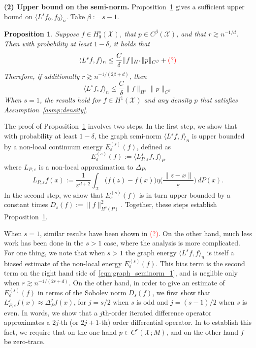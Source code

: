 \documentclass{article}
\newcommand{\1}{\mathbf{1}}
\newcommand{\mc}[1]{\mathcal{#1}}
\newcommand{\dotp}[2]{\langle #1, #2 \rangle}
\theoremstyle{alden}
\theoremstyle{aldenthm}
\newtheorem{proposition}{Proposition}
\theoremstyle{definition}
\theoremstyle{remark}
\begin{document}
\textbf{(2) Upper bound on the semi-norm. } Proposition~\ref{prop:graph_seminorm} gives a sufficient upper bound on $\dotp{L^s f_0}{f_0}_n$. Take $\beta := s - 1$. 
\begin{proposition}
	\label{prop:graph_seminorm} 
	Suppose $f \in H_0^s(\mc{X})$, that $p \in C^{\beta}(\mc{X})$, and that $r \gtrsim n^{-1/d}$. Then with probability at least $1 - \delta$, it holds that 
	\begin{equation}
	\label{eqn:graph_seminorm_1}
	\dotp{L^s f}{f}_n \leq \frac{C}{\delta} \|f\|_{H^s} \|p\|_{C^{\beta}} + \textcolor{red}{(?)}
	\end{equation}
	Therefore, if additionally $r \gtrsim n^{-1/(2\beta + d)}$, then 
	\begin{equation}
	\label{eqn:graph_seminorm_2}
	\dotp{L^s f}{f}_n \leq \frac{C}{\delta} \|f\|_{H^s} \|p\|_{C^{\beta}}
	\end{equation}
	When $s = 1$, the results hold for $f \in H^1(\mc{X})$ and any density $p$ that satisfies Assumption~\ref{asmp:density}.
\end{proposition}
The proof of Proposition~\ref{prop:graph_seminorm} involves two steps. In the first step, we show that with probability at least $1 - \delta$, the graph semi-norm $\dotp{L^s f}{f}_n$ is upper bounded by a non-local continuum energy $E_{\varepsilon}^{(s)}(f)$, defined as
\begin{equation*}
E_{\varepsilon}^{(s)}(f) := \dotp{L_{P,\varepsilon}^sf}{f}_{P}
\end{equation*}
where $L_{P,\varepsilon}$ is a non-local approximation to $\Delta_P$, 
\begin{equation}
\label{eqn:nonlocal_laplacian}
L_{P,\varepsilon}f(x) := \frac{1}{\varepsilon^{d + 2}}\int_{\mc{X}}\bigl(f(z) - f(x)\bigr) \eta\biggl(\frac{\|z - x\|}{\varepsilon}\biggr) \,dP(x).
\end{equation}
In the second step, we show that $E_{\varepsilon}^{(s)}(f)$ is in turn upper bounded by a constant times $D_s(f) := \|f\|_{H^s(P)}^2$. Together, these steps establish Proposition~\ref{prop:graph_seminorm}.

When $s = 1$, similar results have been shown in \textcolor{red}{(?)}. On the other hand, much less work has been done in the $s > 1$ case, where the analysis is more complicated. For one thing, we note that when $s > 1$ the graph energy $\dotp{L^s f}{f}_n$ is itself a biased estimate of the non-local energy $E_{\varepsilon}^{(s)}(f)$. This bias term is the second term on the right hand side of~\eqref{eqn:graph_seminorm_1}, and is neglible only when $r \gtrsim n^{-1/(2r + d)}$. On the other hand, in order to give an estimate of $E_{\varepsilon}^{(s)}(f)$ in terms of the Sobolev norm $D_s(f)$, we first show that $L_{P,\varepsilon}^jf(x) \approx \Delta_P^jf(x)$, for $j = s/2$ when $s$ is odd and $j = (s - 1)/2$ when $s$ is even. In words, we show that a $j$th-order iterated difference operator approximates a $2j$-th (or $2j + 1$-th) order differential operator.  In to establish this fact, we require that on the one hand $p \in C^{r}(\mc{X};M)$, and on the other hand $f$ be zero-trace.
\end{document}
